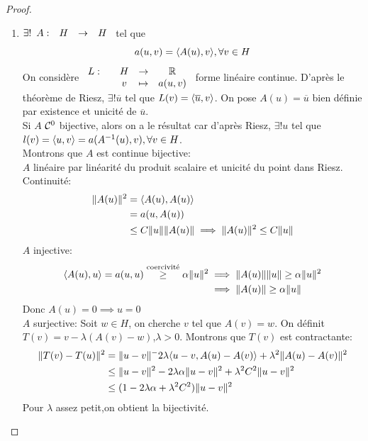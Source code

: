 \documentclass[]{report}
\begin{document}
    \begin{proof}
        \begin{enumerate}
            \item $\exists! \begin{array}{ccccc} A : & H & \to & H \end{array}$ tel que
            \[a(u,v)=\langle A(u),v \rangle,\forall v\in H\]
            On considère $\begin{array}{ccccc} L : & & H & \to & \mathbb{R} \\ & & v & \mapsto & a(u,v) \end{array}$ forme linéaire continue. D'après le théorème de Riesz, $\exists! \overline{u}$ tel que $L(v)=\langle \overline{u},v \rangle$. On pose $A(u)=\overline{u}$ bien définie par existence et unicité de $\overline{u}$.\\
            Si $A$ $\mathcal{C}^0$ bijective, alors on a le résultat car d'après Riesz, $\exists! u$ tel que $l(v)=\langle u,v \rangle=a(A^{-1}(u),v),\forall v\in H$.\\
            Montrons que $A$ est continue bijective:\\
            $A$ linéaire par linéarité du produit scalaire et unicité du point dans Riesz.\\
            Continuité:\begin{align*}
                \lVert A(u) \rVert^2&=\langle A(u),A(u) \rangle\\
                &=a(u,A(u))\\
                &\le C\lVert u \rVert\lVert A(u) \rVert \implies \lVert A(u) \rVert^2\le C\lVert u \rVert
            \end{align*}
            $A$ injective:
            \begin{align*}
                \langle A(u),u \rangle=a(u,u)\overset{\text{coercivité}}{\ge} \alpha \lVert u \rVert^2&\implies \lVert A(u) \rVert\lVert u \rVert\ge \alpha \lVert u \rVert^2\\
                &\implies \lVert A(u) \rVert\ge \alpha \lVert u \rVert
            \end{align*}
            Donc $A(u)=0\implies u=0$\\
            $A$ surjective: Soit $w\in H$, on cherche $v$ tel que $A(v)=w$. On définit $T(v)=v-\lambda (A(v)-w)$,$\lambda>0$.
            Montrons que $T(v)$ est contractante:
            \begin{align*}
                \lVert T(v)-T(u) \rVert^2&=\lVert u-v \rVert^-2\lambda\langle u-v,A(u)-A(v) \rangle +\lambda^2\lVert A(u)-A(v) \rVert^2\\
                &\le \lVert u-v \rVert^2-2\lambda \alpha \lVert u-v \rVert^2+\lambda^2C^2\lVert u-v \rVert^2\\
                &\le (1-2\lambda \alpha +\lambda^2C^2)\lVert u-v \rVert^2 
            \end{align*}
            Pour $\lambda$ assez petit,on obtient la bijectivité.
        \end{enumerate}
    \end{proof}
\end{document}
